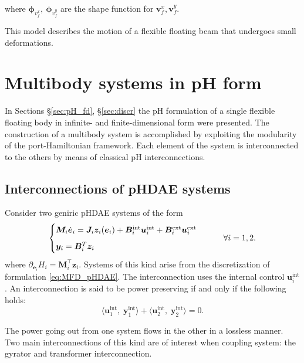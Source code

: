 \documentclass{svjour3}                     %
\newcommand{\secref}[1]{\S\ref{#1}}
\begin{document}
where $\bm{\phi}_{v_f^x}, \ \bm{\phi}_{v_f^y}$ are the shape function for $\bm{v}_f^x, \bm{v}_f^y$.

This model describes the motion of a flexible floating beam that undergoes small deformations. 

\section{Multibody systems in pH form}
\label{sec:MB_pH}
In Sections \secref{sec:pH_fd}, \secref{sec:discr} the pH formulation of a single flexible floating body in infinite- and finite-dimensional form were presented. The construction of a multibody system is accomplished by exploiting the modularity of the port-Hamiltonian framework. Each element of the system is interconnected to the others by means of classical pH interconnections.

\subsection{Interconnections of pHDAE systems}
Consider two geniric pHDAE systems of the form
\begin{equation}
\begin{cases}
\bm{M}_i \dot{\bm{e}}_i = \bm{J}_i \bm{z}_i(\bm{e}_i) + \bm{B}_i^{\text{int}} \bm{u}_i^{\text{int}} + \bm{B}_i^{\text{ext}} \bm{u}_i^{\text{ext}}  \vspace{2mm} \\
\bm{y}_i = \bm{B}_i^T  \bm{z}_i
\end{cases} \qquad \forall i = 1, 2.
\end{equation}
where $\partial_{\bm{e}_i} {H_i} = \bm{M}_i^\top \bm{z}_i$. Systems of this kind arise from the discretization of formulation \eqref{eq:MFD_pHDAE}. The interconnection uses the internal control $\bm{u}_i^{\text{int}}$. An interconnection is said to be power preserving if and only if the following holds:
\begin{equation} \label{eq:int_balance}
\langle \bm{u}_1^{\text{int}}, \; \bm{y}_1^{\text{int}} \rangle + \langle \bm{u}_2^{\text{int}}, \; \bm{y}_2^{\text{int}} \rangle = 0.
\end{equation}

The power going out from one system flows in the other in a lossless manner. Two main interconnections of this kind are of interest when coupling system: the gyrator and transformer interconnection.
\end{document}
